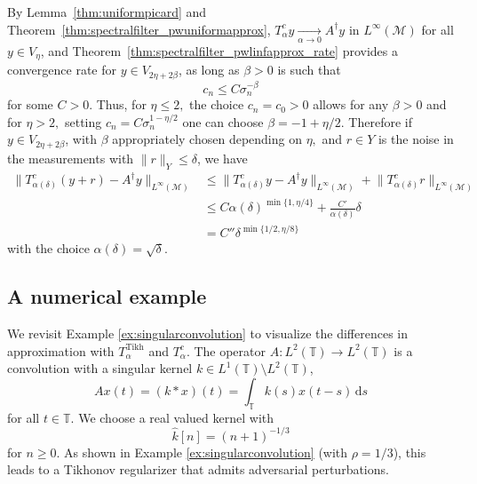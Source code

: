 \documentclass{article}
\theoremstyle{definition}
\newcommand{\T}{\mathbb{T}}
\newcommand{\di}{\,\mathrm{d}}
\newcommand{\smallnorm}[1]{\lVert#1\rVert}
\newcommand{\fhat}[1]{\widehat{#1}}
\newcommand{\pseudoinv}[1]{{#1}^\dagger}
\begin{document}
By Lemma~\ref{thm:uniformpicard} and Theorem~\ref{thm:spectralfilter_pwuniformapprox},
\(T^c_\alpha y\xrightarrow[\alpha\to 0]{} \pseudoinv{A}y\) in \(L^\infty(\mathcal{M})\) for all \(y\in V_\eta\),
and Theorem~\ref{thm:spectralfilter_pwlinfapprox_rate} provides a convergence rate for \(y\in V_{2\eta+2\beta} \), as long as $\beta>0$ is such that
$$
c_n \leq C \sigma_n^{-\beta}
$$
for some $C>0.$ Thus, for $\eta \leq 2,$ the choice $c_n=c_0>0$ allows for any $\beta>0$ and for $\eta >2,$ setting $c_n = C \sigma_n^{1-\eta/2}$ one can choose $\beta = -1+\eta/2.$
Therefore if \(y\in V_{2 \eta+2 \beta}\), with $\beta$ appropriately chosen depending on $\eta,$ and $r\in Y$ is the noise in the measurements with $\|r\|_Y\le\delta$, we have
\begin{align*}
    \smallnorm{T^{c}_{\alpha(\delta)} (y+r) - \pseudoinv{A}y}_{L^\infty(\mathcal{M})}
    &\leq
    \smallnorm{T^{c}_{\alpha(\delta)} y - \pseudoinv{A}y}_{L^\infty(\mathcal{M})}
    +
    \smallnorm{T^{c}_{\alpha(\delta)} r}_{L^\infty(\mathcal{M})}\\
    &\leq
    C\alpha(\delta)^{\min\{1,\eta/4\}}
    +
    \frac{C'}{\alpha(\delta)}
    \delta\\
    &=
    C'' \delta^{\min\{1/2,\eta/8\}}
\end{align*}
with the choice \(\alpha(\delta)=\sqrt{\delta}\).






\subsection{A numerical example}

We revisit Example \ref{ex:singularconvolution} to visualize the differences in approximation with 
\(T^{\mathrm{Tikh}}_\alpha\) and \(T^{c}_\alpha\).
The operator \(A\colon L^2(\T)\to L^2(\T)\) is a convolution with a singular kernel \(k\in L^1(\T)\setminus L^2(\T)\),
\begin{equation*}
    Ax (t)= \left(k*x\right)(t) = \int_\T k(s) x(t-s)\di s
\end{equation*}
for all \(t\in\T\).
We choose a real valued kernel with
\begin{equation}
\label{eq:singularkernel}
    \fhat{k}[n] = (n+1)^{-1/3}
\end{equation}
for \(n\geq 0\).
As shown in Example \ref{ex:singularconvolution} (with \(\rho=1/3\)), this leads to a Tikhonov regularizer that admits adversarial perturbations.
\end{document}
